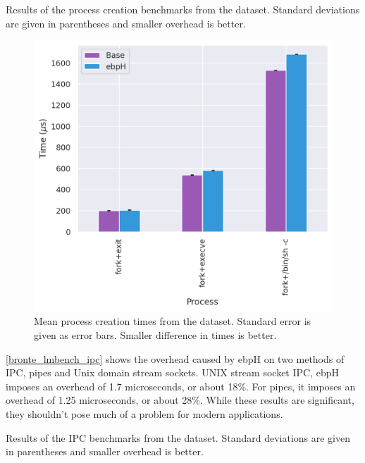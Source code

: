 \documentclass[
  12pt]{findlay}
\begin{document}
\begin{table}
    \caption[Results of the process creation benchmarks from the  dataset]{
        Results of the process creation benchmarks from the  dataset.
        Standard deviations are given in parentheses and smaller overhead is better.
    }
    \label{bronte_lmbench_process}
    
\end{table}

\begin{figure}
    \caption[Mean process creation times from the  dataset]{
        Mean process creation times from the  dataset.
        Standard error is given as error bars.
        Smaller difference in times is better.
    }
    \label{bronte_lmbench_process_graph}
    \includegraphics[width=.8\textwidth]{../data/bench/bronte-lmbench/process_times.png}
\end{figure}

\FloatBarrier

\autoref{bronte_lmbench_ipc} shows the overhead caused by ebpH on two
methods of IPC, pipes and Unix domain stream sockets. UNIX stream socket
IPC, ebpH imposes an overhead of 1.7 microseconds, or about 18\%. For
pipes, it imposes an overhead of 1.25 microseconds, or about 28\%. While
these results are significant, they shouldn't pose much of a problem for
modern applications.

\begin{table}
    \caption[Results of the IPC benchmarks from the  dataset]{
        Results of the IPC benchmarks from the  dataset.
        Standard deviations are given in parentheses and smaller overhead is better.
    }
    \label{bronte_lmbench_ipc}
    
\end{table}
\end{document}
